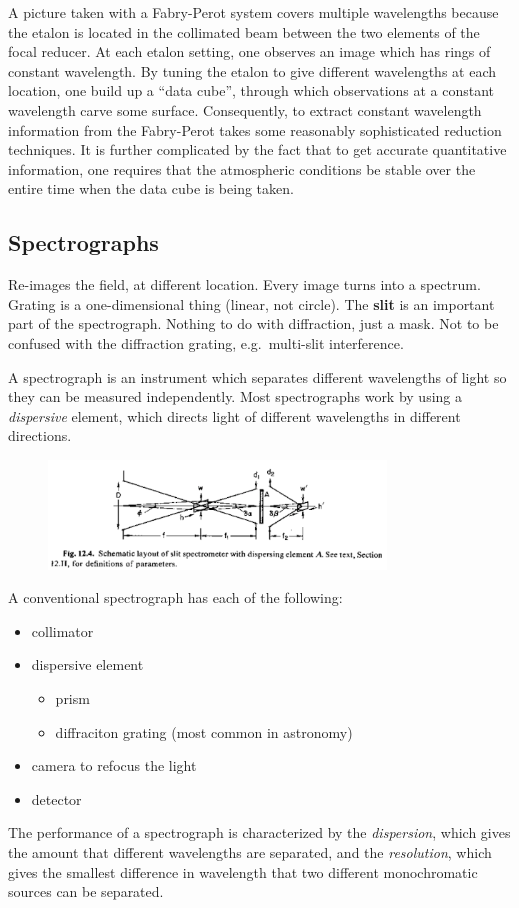 \documentclass[12pt]{article}
\newcommand{\mynotes}[1]{\textcolor{myBlue}{#1}}
\begin{document}
A picture taken with a Fabry-Perot system covers multiple wavelengths
because the etalon is located in the collimated beam between the two
elements of the focal reducer. At each etalon setting, one observes an
image which has rings of constant wavelength. By tuning the etalon to
give different wavelengths at each location, one build up a ``data
cube'', through which observations at a constant wavelength carve some
surface. Consequently, to extract constant wavelength information from
the Fabry-Perot takes some reasonably sophisticated reduction
techniques. It is further complicated by the fact that to get accurate
quantitative information, one requires that the atmospheric conditions
be stable over the entire time when the data cube is being taken.

\subsection{Spectrographs}
\mynotes{Re-images the field, at different location. Every image turns into
a spectrum. Grating is a one-dimensional thing (linear, not circle).
The \textbf{slit} is an important part of the spectrograph. Nothing
to do with diffraction, just a mask. Not to be confused with the
diffraction grating, e.g.\ multi-slit interference.}

A spectrograph is an instrument which separates different wavelengths
of light so they can be measured independently. Most spectrographs
work by using a \textit{dispersive} element, which directs light of different
wavelengths in different directions.
\begin{figure}
    \centering
    \includegraphics[width=0.8\textwidth]{slit2.png}
\end{figure}
A conventional spectrograph has each of the following:
\begin{itemize}
    \item collimator
    \item dispersive element
        \begin{itemize}
            \item prism
            \item diffraciton grating (most common in astronomy)
        \end{itemize}
    \item camera to refocus the light
    \item detector
\end{itemize}
The performance of a spectrograph is characterized by the \textit{dispersion},
which gives the amount that different wavelengths are separated, and the
\textit{resolution}, which gives the smallest difference in wavelength that two
different monochromatic sources can be separated.
\end{document}
